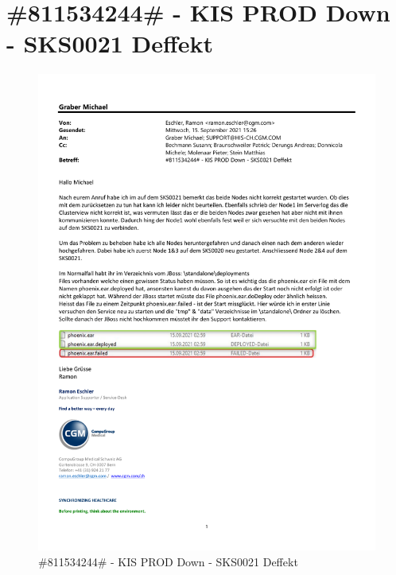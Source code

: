 
\section{\#811534244\# - KIS PROD Down - SKS0021 Deffekt}
\label{chap:811534244}
\begin{flushleft}
    \begin{figure}[H]
        \centering
        \includegraphics[width=1\linewidth]{source/appendix/jboss_deployments}
        \caption{\#811534244\# - KIS PROD Down - SKS0021 Deffekt}
        \label{fig:811534244}
    \end{figure}
\end{flushleft}